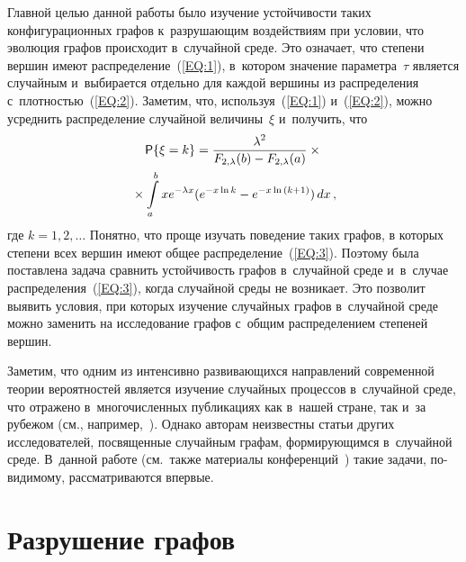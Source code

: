\begin{multicols}{2}
Главной целью данной работы было изучение устой\-чи\-вости таких конфигурационных графов
к~раз\-ру\-ша\-ющим воздействиям при условии, что эволюция графов происходит в~случайной
среде. Это означает, что степени вершин имеют распределение~(\ref{EQ:1}), в~котором
значение параметра~$\tau$ является случайным и~выбирается отдельно для каждой вершины
из распределения с~плот\-ностью~(\ref{EQ:2}). 
%
Заметим, что, используя~(\ref{EQ:1}) 
и~(\ref{EQ:2}), мож\-но усред\-нить распределение случайной величины~$\xi$ и~получить,
что
\begin{multline}
\label{EQ:3}
{\sf P}\{\xi=k\}=\displaystyle\frac{\displaystyle \lambda^2\mathstrut}{\displaystyle F_{2,\lambda}(b)-F_{2,\lambda}(a)\mathstrut}\times{}\\
{}\times \int\limits_a^b
xe^{-\lambda x}(e^{-x\ln k}-e^{-x\ln{(k+1)}})\,dx\,,
\end{multline}
где $k=1,2,\dots$ Понятно, что проще изучать поведение таких графов,
в которых степени всех вершин име\-ют общее распределение~(\ref{EQ:3}). Поэтому была
поставлена задача срав\-нить устой\-чи\-вость графов в~случайной среде и~в~случае
распределения~(\ref{EQ:3}), когда случайной среды не возникает. Это поз\-во\-лит вы\-явить
условия, при которых изучение случайных графов в~случайной среде мож\-но заменить на
исследование графов с~общим распределением степеней вершин. 

Заметим, что одним из
интенсивно раз\-ви\-ва\-ющих\-ся на\-прав\-ле\-ний современной тео\-рии вероятностей является
изучение случайных процессов в~случайной среде, что отражено в~мно\-го\-чис\-лен\-ных
пуб\-ли\-ка\-ци\-ях как в~нашей стране, так и~за рубежом (см., например,~\cite{Afan}). Однако
авторам неизвестны статьи других исследователей, посвященные случайным графам, 
фор\-ми\-ру\-ющим\-ся в~случайной среде. В~данной работе (см.\
 так\-же материалы конференций~\cite{Pav,Ler4})
такие задачи, по-ви\-ди\-мо\-му, рассматриваются впервые.

\columnbreak


\section{Разрушение графов} %

\vspace*{-9pt}


\end{multicols}
